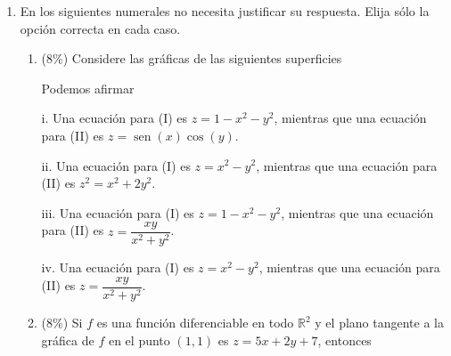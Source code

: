\documentclass[11pt]{article}
\begin{document}
\vspace{10pt}
\begin{enumerate}
\item{} En los siguientes numerales no necesita justificar su respuesta. Elija sólo la opción correcta en cada caso.

\begin{enumerate}
\item{} (8\%) Considere las gráficas de las siguientes superficies

\vspace{6pt}
\begin{center}
\end{center}
\noindent Podemos afirmar

\vspace{4pt}
\noindent i. Una ecuación para (I) es $z=1-x^2-y^2$, mientras que una ecuación para (II) es $z=\operatorname{sen}(x)\cos(y)$.

\noindent ii. Una ecuación para (I) es $z=x^2-y^2$, mientras que una ecuación para (II) es $z^2=x^2+2y^2$.

\noindent iii. Una ecuación para (I) es $z=1-x^2-y^2$, mientras que una ecuación para (II) es $z=\dfrac{xy}{x^2+y^2}$.

\noindent iv. Una ecuación para (I) es $z=x^2-y^2$, mientras que una ecuación para (II) es $z=\dfrac{xy}{x^2+y^2}$.

\item{} (8\%) Si $f$ es una función diferenciable en todo $\mathbb{R}^2$ y el plano tangente a la gráfica de $f$ en el punto $(1,1)$ es $z=5x+2y+7$, entonces


\end{enumerate}
\end{enumerate}
\end{document}
